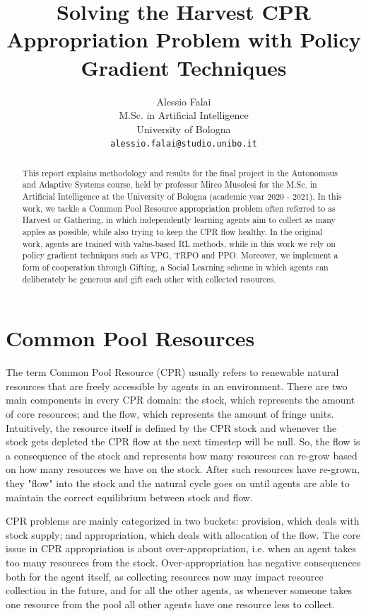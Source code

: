 \documentclass{article}
\title{Solving the Harvest CPR Appropriation Problem with Policy Gradient Techniques}
\author{
  Alessio Falai\\
  M.Sc. in Artificial Intelligence\\
  University of Bologna\\
  \texttt{alessio.falai@studio.unibo.it} \\
}
\begin{document}
\maketitle

\begin{abstract}
  This report explains methodology and results for the final project in the Autonomous and Adaptive Systems course, held by professor Mirco Musolesi for the M.Sc. in Artificial Intelligence at the University of Bologna (academic year 2020 - 2021). In this work, we tackle a Common Pool Resource appropriation problem often referred to as Harvest or Gathering, in which independently learning agents aim to collect as many apples as possible, while also trying to keep the CPR flow healthy. In the original work, agents are trained with value-based RL methods, while in this work we rely on policy gradient techniques such as VPG, TRPO and PPO. Moreover, we implement a form of cooperation through Gifting, a Social Learning scheme in which agents can deliberately be generous and gift each other with collected resources.
\end{abstract}

\section{Common Pool Resources}
The term Common Pool Resource (CPR) usually refers to renewable natural resources that are freely accessible by agents in an environment. There are two main components in every CPR domain: the stock, which represents the amount of core resources; and the flow, which represents the amount of fringe units. Intuitively, the resource itself is defined by the CPR stock and whenever the stock gets depleted the CPR flow at the next timestep will be null. So, the flow is a consequence of the stock and represents how many resources can re-grow based on how many resources we have on the stock. After such resources have re-grown, they "flow" into the stock and the natural cycle goes on until agents are able to maintain the correct equilibrium between stock and flow. 

CPR problems are mainly categorized in two buckets: provision, which deals with stock supply; and appropriation, which deals with allocation of the flow. The core issue in CPR appropriation is about over-appropriation, i.e. when an agent takes too many resources from the stock. Over-appropriation has negative consequences both for the agent itself, as collecting resources now may impact resource collection in the future, and for all the other agents, as whenever someone takes one resource from the pool all other agents have one resource less to collect.
\end{document}
